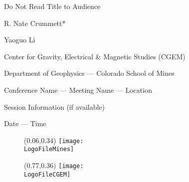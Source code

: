 \documentclass[dark]{cgem-presentation}
\begin{document}
\begin{frame}[plain]
	\begin{center}
		\vspace{1cm}
		\Huge
		Do Not Read Title to Audience

		\vspace{1cm}
		{ \color{SecondColor}
		\huge
		R. Nate Crummett*

		\vspace{2mm}
		Yaoguo Li
		}

		\vspace{1.2cm}
		{ \itshape
		{ \color{SecondColor}
		\Large
		Center for Gravity, Electrical \& Magnetic Studies (CGEM)

		\large
		\vspace{-5mm}
		Department of Geophysics --- Colorado School of Mines
		}

		\vspace{1mm}
		\normalsize
		Conference Name --- Meeting Name --- Location

		Session Information (if available)

		\vspace{-6mm}
		Date --- Time
		}
	\end{center}

	\begin{figure}
		\begin{textblock*}{2.7cm}(0.06\paperwidth,0.34\paperheight)
			\texttt{[image: \\LogoFileMines]}
		\end{textblock*}
	\end{figure}

	\begin{figure}
		\vspace*{-11.09294pt}
		\begin{textblock*}{2.85cm}(0.77\paperwidth,0.36\paperheight)
			\texttt{[image: \\LogoFileCGEM]}
		\end{textblock*}
	\end{figure}

\end{frame}
\end{document}

